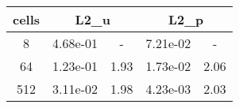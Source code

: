 \documentclass[10pt]{report}
\begin{document}
\begin{table}[H]
\begin{center}
\begin{tabular}{|c|c|c|c|c|} \hline
cells & 
\multicolumn{2}{|c|}{L2_u} & 
\multicolumn{2}{|c|}{L2_p}\\ \hline
8 & 4.68e-01 & - & 7.21e-02 & -\\ \hline
64 & 1.23e-01 & 1.93 & 1.73e-02 & 2.06\\ \hline
512 & 3.11e-02 & 1.98 & 4.23e-03 & 2.03\\ \hline
\end{tabular}
\end{center}
\end{table}
\end{document}
